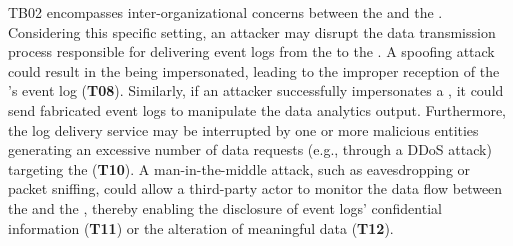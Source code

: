 \begin{newj}
TB02  encompasses inter-organizational concerns between the  and the . Considering this specific setting, an attacker may disrupt the data transmission process responsible for delivering event logs from the  to the . A spoofing attack could result in the  being impersonated, leading to the improper reception of the 's event log (\textbf{T08}). Similarly, if an attacker successfully impersonates a , it could send fabricated event logs to manipulate the data analytics output. Furthermore, the log delivery service may be interrupted by one or more malicious entities generating an excessive number of data requests (e.g., through a DDoS attack) targeting the  (\textbf{T10}). A man-in-the-middle attack, such as eavesdropping or packet sniffing, could allow a third-party actor to monitor the data flow between the  and the , thereby enabling the disclosure of event logs' confidential information (\textbf{T11}) or the alteration of meaningful data (\textbf{T12}).


\end{newj}
